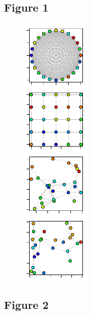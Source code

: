 \documentclass[12pt]{article}
\begin{document}
\newpage
\subsection*{Figure 1}

\begin{figure}[ht!]
	\centering\includegraphics[width=0.3\textwidth]{Networks.pdf}
\end{figure}

\newpage


\subsection*{Figure 2}
\end{document}
